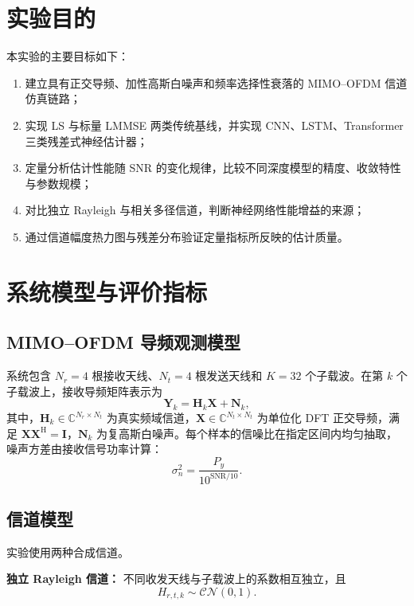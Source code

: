 \documentclass[UTF8,a4paper,12pt]{ctexart}
\begin{document}
\section{实验目的}

本实验的主要目标如下：
\begin{enumerate}[label=(\arabic*)]
  \item 建立具有正交导频、加性高斯白噪声和频率选择性衰落的 MIMO--OFDM 信道仿真链路；
  \item 实现 LS 与标量 LMMSE 两类传统基线，并实现 CNN、LSTM、Transformer 三类残差式神经估计器；
  \item 定量分析估计性能随 SNR 的变化规律，比较不同深度模型的精度、收敛特性与参数规模；
  \item 对比独立 Rayleigh 与相关多径信道，判断神经网络性能增益的来源；
  \item 通过信道幅度热力图与残差分布验证定量指标所反映的估计质量。
\end{enumerate}

\section{系统模型与评价指标}

\subsection{MIMO--OFDM 导频观测模型}

系统包含 $N_r=4$ 根接收天线、$N_t=4$ 根发送天线和 $K=32$ 个子载波。在第 $k$ 个子载波上，接收导频矩阵表示为
\begin{equation}
  \bm Y_k=\bm H_k\bm X+\bm N_k,
  \label{eq:system}
\end{equation}
其中，$\bm H_k\in\mathbb C^{N_r\times N_t}$ 为真实频域信道，$\bm X\in\mathbb C^{N_t\times N_t}$ 为单位化 DFT 正交导频，满足 $\bm X\bm X^{\mathrm H}=\bm I$，$\bm N_k$ 为复高斯白噪声。每个样本的信噪比在指定区间内均匀抽取，噪声方差由接收信号功率计算：
\begin{equation}
  \sigma_n^2=\frac{P_y}{10^{\mathrm{SNR}/10}}.
\end{equation}

\subsection{信道模型}

实验使用两种合成信道。

\textbf{独立 Rayleigh 信道：} 不同收发天线与子载波上的系数相互独立，且
\begin{equation}
  H_{r,t,k}\sim\mathcal{CN}(0,1).
\end{equation}
\end{document}
